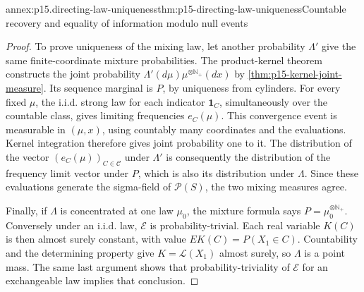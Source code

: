 \begin{annexitem}{annex:p15.directing-law-uniqueness}{thm:p15-directing-law-uniqueness}{Countable recovery and equality of information modulo null events}
\begin{proof}
To prove uniqueness of the mixing law, let another probability
\(\Lambda'\) give the same finite-coordinate mixture probabilities.
The product-kernel theorem constructs the joint probability
\(\Lambda'(d\mu)\mu^{\otimes\mathbb N_+}(dx)\)
by \cref{thm:p15-kernel-joint-measure}.
Its sequence marginal is \(P\), by uniqueness from cylinders.
For every fixed \(\mu\), the i.i.d. strong law for each indicator
\(\mathbf1_C\), simultaneously over the countable class, gives
limiting frequencies \(e_C(\mu)\).
This convergence event is measurable in \((\mu,x)\), using countably
many coordinates and the evaluations. Kernel integration therefore
gives joint probability one to it.
The distribution of the vector \((e_C(\mu))_{C\in\mathcal C}\)
under \(\Lambda'\) is consequently the distribution of the frequency
limit vector under \(P\), which is also its distribution under
\(\Lambda\). Since these evaluations generate the sigma-field of
\(\mathscr P(S)\), the two mixing measures agree.

Finally, if \(\Lambda\) is concentrated at one law \(\mu_0\),
the mixture formula says \(P=\mu_0^{\otimes\mathbb N_+}\).
Conversely under an i.i.d. law, \(\mathcal E\) is probability-trivial.
Each real variable \(K(C)\) is then almost surely constant, with value
\(E K(C)=P(X_1\in C)\).
Countability and the determining property give \(K=\mathcal L(X_1)\)
almost surely, so \(\Lambda\) is a point mass.
The same last argument shows that probability-triviality of
\(\mathcal E\) for an exchangeable law implies that conclusion.
\end{proof}
\end{annexitem}

